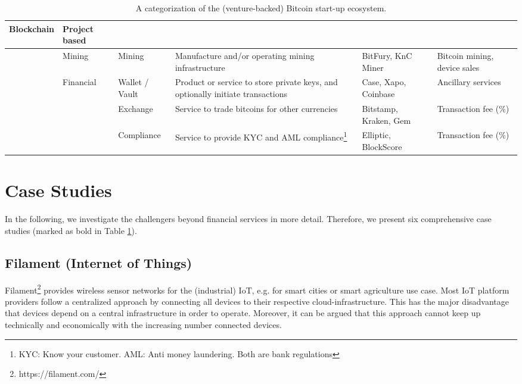 \begin{table}
{\begin{tabular}{|>{\raggedright}p{17pt}|>{\raggedright}p{46pt}|>{\raggedright}p{68pt}|>{\raggedright}p{115pt}|>{\raggedright}p{53pt}|>{\raggedright}p{85pt}|}
Blockchain & Project based\tabularnewline
\hline
 & Mining & Mining & Manufacture and/or operating mining infrastructure & BitFury, 
KnC Miner & Bitcoin mining, device sales\tabularnewline
\hline
 & Financial & Wallet / Vault & Product or service to store private keys, and optionally 
initiate transactions & Case, Xapo, Coinbase & Ancillary services\tabularnewline
\hline
 &  & Exchange & Service to trade bitcoins for other currencies & Bitstamp, Kraken, 
Gem & Transaction fee (\%)\tabularnewline
\hline
 &  & Compliance & Service to provide KYC and AML compliance\footnote{ KYC: Know 
your customer. AML: Anti money laundering. Both are bank regulations} & Elliptic, 
BlockScore & Transaction fee (\%)\tabularnewline
\hline
\end{tabular}}
\label{tbl:ecosystem}
\caption{A categorization of the (venture-backed) Bitcoin start-up ecosystem.}
\end{table}


\section{Case Studies}
\label{sec:eco:cases}


In the following, we investigate the challengers beyond financial services in more 
detail. Therefore, we present six comprehensive case studies (marked as bold in Table 
\ref{tbl:ecosystem}).

\subsection{Filament (Internet of Things)}
\label{sec:ecofilament}

Filament\footnote{https://filament.com/} provides wireless sensor networks for the (industrial) IoT, e.g. 
for smart cities or smart agriculture use case. Most IoT platform providers follow 
a centralized approach by connecting all devices to their respective cloud-infrastructure. 
This has the major disadvantage that devices depend on a central infrastructure 
in order to operate. Moreover, it can be argued that this approach cannot keep 
up technically and economically with the increasing number connected devices.

